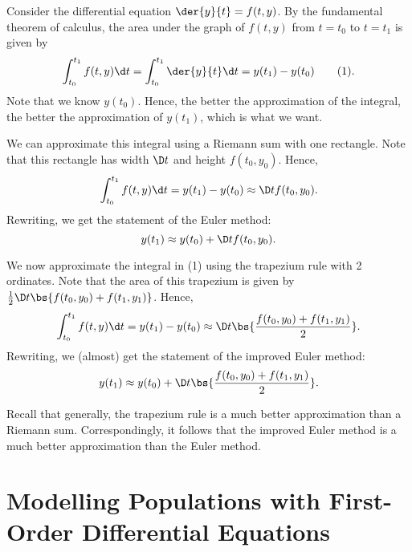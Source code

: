 Consider the differential equation $\der{y}{t} = f(t, y)$. By the fundamental theorem of calculus, the area under the graph of $f(t, y)$ from $t = t_0$ to $t = t_1$ is given by \[\int_{t_0}^{t_1} f(t, y) \d t = \int_{t_0}^{t_1} \der{y}{t} \d t = y(t_1) - y(t_0) \tag{1}.\] Note that we know $y(t_0)$. Hence, the better the approximation of the integral, the better the approximation of $y(t_1)$, which is what we want.

We can approximate this integral using a Riemann sum with one rectangle. Note that this rectangle has width $\D t$ and height $f(t_0, y_0)$. Hence, \[\int_{t_0}^{t_1} f(t, y) \d t = y(t_1) - y(t_0) \approx \D t f(t_0, y_0).\] Rewriting, we get the statement of the Euler method: \[y(t_1) \approx y(t_0) + \D t f(t_0, y_0).\]

We now approximate the integral in (1) using the trapezium rule with 2 ordinates. Note that the area of this trapezium is given by $\frac12 \D t \bs{f(t_0, y_0) + f(t_1, y_1)}$. Hence, \[\int_{t_0}^{t_1} f(t, y) \d t = y(t_1) - y(t_0) \approx \D t \bs{\frac{f(t_0, y_0) +f(t_1, y_1)}{2}}.\] Rewriting, we (almost) get the statement of the improved Euler method: \[y(t_1) \approx y(t_0) + \D t \bs{\frac{f(t_0, y_0) +f(t_1, y_1)}{2}}.\]

Recall that generally, the trapezium rule is a much better approximation than a Riemann sum. Correspondingly, it follows that the improved Euler method is a much better approximation than the Euler method.

\section{Modelling Populations with First-Order Differential Equations}

